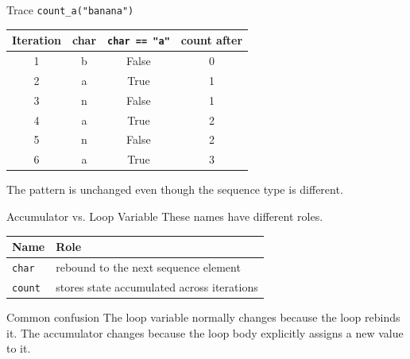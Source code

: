 \documentclass[aspectratio=169,10pt]{beamer}
\begin{document}
\begin{frame}{Trace \texttt{count\_a("banana")}}
  \begin{center}
    \renewcommand{\arraystretch}{1.22}
    \begin{tabular}{c|c|c|c}
      \textbf{Iteration} & \textbf{char} & \textbf{\texttt{char == "a"}} & \textbf{count after} \\\hline
      1 & b & False & 0 \\
      2 & a & True & 1 \\
      3 & n & False & 1 \\
      4 & a & True & 2 \\
      5 & n & False & 2 \\
      6 & a & True & 3
    \end{tabular}
  \end{center}

  The pattern is unchanged even though the sequence type is different.
\end{frame}

\begin{frame}{Accumulator vs. Loop Variable}
  These names have different roles.

  \begin{center}
    \renewcommand{\arraystretch}{1.3}
    \begin{tabular}{l|l}
      \textbf{Name} & \textbf{Role} \\\hline
      \texttt{char} & rebound to the next sequence element \\
      \texttt{count} & stores state accumulated across iterations
    \end{tabular}
  \end{center}

  \begin{alertblock}{Common confusion}
    The loop variable normally changes because the loop rebinds it. The accumulator changes because the loop body explicitly assigns a new value to it.
  \end{alertblock}
\end{frame}
\end{document}
